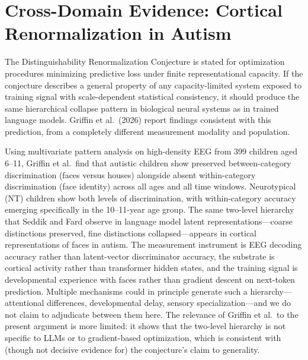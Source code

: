 \documentclass[11pt]{article}
\begin{document}
\section{Cross-Domain Evidence: Cortical Renormalization in Autism}
\label{sec:crossdomain}

The Distinguishability Renormalization Conjecture is stated for optimization procedures
minimizing predictive loss under finite representational capacity. If the conjecture describes
a general property of any capacity-limited system exposed to training signal with scale-dependent
statistical consistency, it should produce the same hierarchical collapse pattern in biological
neural systems as in trained language models. Griffin et al.\ (2026) report findings consistent
with this prediction, from a completely different measurement modality and population.

Using multivariate pattern analysis on high-density EEG from 399 children aged 6--11, Griffin
et al.\ find that autistic children show preserved between-category discrimination (faces versus
houses) alongside absent within-category discrimination (face identity) across all ages and all
time windows. Neurotypical (NT) children show both levels of discrimination, with within-category
accuracy emerging specifically in the 10--11-year age group. The same two-level hierarchy that
Seddik and Fard observe in language model latent representations---coarse distinctions preserved,
fine distinctions collapsed---appears in cortical representations of faces in autism. The
measurement instrument is EEG decoding accuracy rather than latent-vector discriminator accuracy,
the substrate is cortical activity rather than transformer hidden states, and the training signal
is developmental experience with faces rather than gradient descent on next-token prediction.
Multiple mechanisms could in principle generate such a hierarchy---attentional differences,
developmental delay, sensory specialization---and we do not claim to adjudicate between them
here. The relevance of Griffin et al.\ to the present argument is more limited: it shows that
the two-level hierarchy is not specific to LLMs or to gradient-based optimization, which is
consistent with (though not decisive evidence for) the conjecture's claim to generality.
\end{document}
